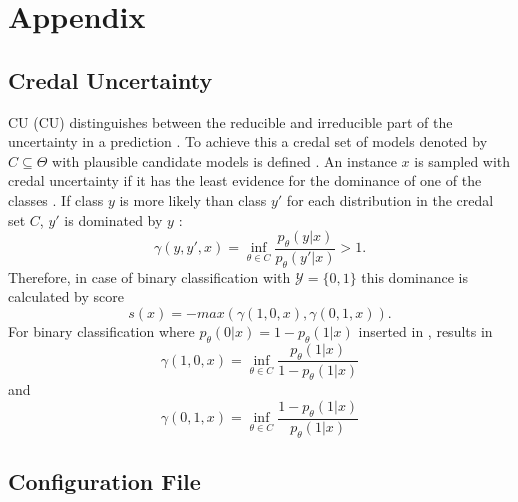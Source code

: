 %
\chapter{Appendix}
\label{sec:appendix}
%
%
\section{Credal Uncertainty}  
\label{subsec:credal_uncertainty}
%
\Acl{CU} (CU) distinguishes between the reducible and irreducible part of the uncertainty in a prediction \cite{nguyen2021howtomeasure}.
To achieve this a credal set of models denoted by $C \subseteq \Theta$ with plausible candidate models is defined \cite{nguyen2021howtomeasure}.
An instance $x$ is sampled with credal uncertainty if it has the least evidence for the dominance of one of the classes \cite{nguyen2021howtomeasure}.
If class $y$ is more likely than class $y'$ for each distribution in the credal set $C$, $y'$ is dominated by $y$ \cite{nguyen2021howtomeasure}:
\begin{equation} \label{eq:credal_uncertainty_dominance}
\gamma(y,y',x) = \inf_{\theta \in C} \frac{p_{\theta}(y | x)}{p_{\theta}(y' | x)} > 1.
\end{equation} 
Therefore, in case of binary classification with $\mathcal{Y} = \{0, 1\}$ this dominance is calculated by score \cite{nguyen2021howtomeasure}
\begin{equation}
    s(x) = -max (\gamma(1,0,x), \gamma(0,1,x)).
\end{equation} 
For binary classification where $p_{\theta}(0|x) = 1 - p_{\theta}(1|x)$ inserted in , results in  \cite{nguyen2021howtomeasure}
\begin{equation}
\gamma(1,0,x) = \inf_{\theta \in C} \frac{p_{\theta}(1 | x)}{1 - p_{\theta}(1 | x)}
\end{equation} 
and
\begin{equation}
\gamma(0,1,x) = \inf_{\theta \in C} \frac{1 - p_{\theta}(1 | x)}{p_{\theta}(1 | x)}
\end{equation} 

\clearpage

\section{Configuration File} \label{app:config_yaml}

\clearpage
